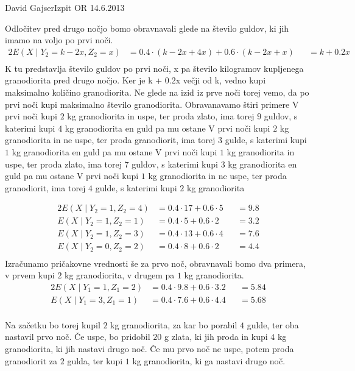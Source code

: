 \begin{naloga}{David Gajser}{Izpit OR 14.6.2013}
\begin{odgovor}
Odločitev pred drugo nočjo bomo obravnavali glede na število guldov, ki jih imamo na voljo po prvi noči.
\begin{alignat*}{2}
E(X \mid  Y_2 = k-2x, Z_2 = x) &= 0.4 \cdot (k - 2x + 4x) + 0.6 \cdot (k - 2x + x) &&= k + 0.2x \\
\end{alignat*}
K tu predstavlja število guldov po prvi noči, x pa število kilogramov kupljenega granodiorita pred drugo nočjo. Ker je k + 0.2x večji od k, vedno kupi maksimalno količino granodiorita.
Ne glede na izid iz prve noči torej vemo, da po prvi noči kupi maksimalno število granodiorita.
Obravanavamo štiri primere
V prvi noči kupi $2$ kg granodiorita in uspe, ter proda zlato, ima torej $9$ guldov, s katerimi kupi $4$ kg granodiorita en guld pa mu ostane
V prvi noči kupi $2$ kg granodiorita in ne uspe, ter proda granodiorit, ima torej $3$ gulde, s katerimi kupi $1$ kg granodiorita en guld pa mu ostane
V prvi noči kupi $1$ kg granodiorita in uspe, ter proda zlato, ima torej $7$ guldov, s katerimi kupi $3$ kg granodiorita en guld pa mu ostane
V prvi noči kupi $1$ kg granodiorita in ne uspe, ter proda granodiorit, ima torej $4$ gulde, s katerimi kupi $2$ kg granodiorita

\begin{alignat*}{2}
E(X \mid  Y_2 = 1, Z_2 = 4) &= 0.4 \cdot 17 + 0.6 \cdot 5 &&= 9.8 \\
E(X \mid  Y_2 = 1, Z_2 = 1) &= 0.4 \cdot 5 + 0.6 \cdot 2 &&= 3.2 \\
E(X \mid  Y_2 = 1, Z_2 = 3) &= 0.4 \cdot 13 + 0.6 \cdot 4 &&= 7.6 \\
E(X \mid  Y_2 = 0, Z_2 = 2) &= 0.4 \cdot 8 + 0.6 \cdot 2 &&= 4.4 \\
\end{alignat*}
Izračunamo pričakovne vrednosti še za prvo noč, obravnavali bomo dva primera, v prvem kupi $2$ kg granodiorita, v drugem pa $1$ kg granodiorita.
\begin{alignat*}{2}
E(X \mid  Y_1 = 1, Z_1 = 2) &= 0.4 \cdot 9.8 + 0.6 \cdot 3.2 &&= 5.84 \\
E(X \mid  Y_1 = 3, Z_1 = 1) &= 0.4 \cdot 7.6 + 0.6 \cdot 4.4 &&= 5.68 \\
\end{alignat*}

Na začetku bo torej kupil $2$ kg granodiorita, za kar bo porabil $4$ gulde, ter oba nastavil prvo noč. Če uspe, bo pridobil $20$ g zlata, ki jih proda in kupi $4$ kg granodiorita, ki jih nastavi drugo noč.
Če mu prvo noč ne uspe, potem proda granodiorit za $2$ gulda, ter kupi $1$ kg granodiorita, ki ga nastavi drugo noč.

\begin{slika}
\makebox[\textwidth][c]{
\pgfslika
}
\end{slika}
\end{odgovor}
\end{naloga}
